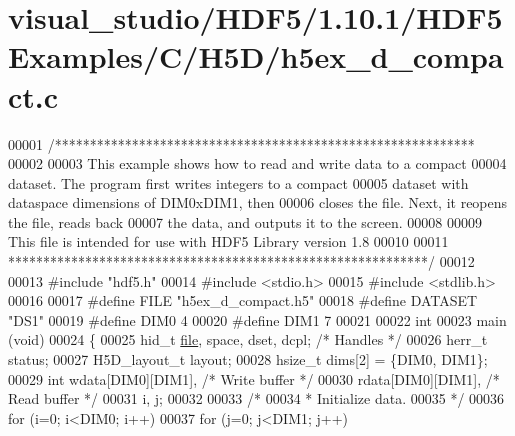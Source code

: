 \hypertarget{visual__studio_2_h_d_f5_21_810_81_2_h_d_f5_examples_2_c_2_h5_d_2h5ex__d__compact_8c_source}{}\section{visual\+\_\+studio/\+H\+D\+F5/1.10.1/\+H\+D\+F5\+Examples/\+C/\+H5\+D/h5ex\+\_\+d\+\_\+compact.c}
\label{visual__studio_2_h_d_f5_21_810_81_2_h_d_f5_examples_2_c_2_h5_d_2h5ex__d__compact_8c_source}

\begin{DoxyCode}
00001 \textcolor{comment}{/************************************************************}
00002 \textcolor{comment}{}
00003 \textcolor{comment}{  This example shows how to read and write data to a compact}
00004 \textcolor{comment}{  dataset.  The program first writes integers to a compact}
00005 \textcolor{comment}{  dataset with dataspace dimensions of DIM0xDIM1, then}
00006 \textcolor{comment}{  closes the file.  Next, it reopens the file, reads back}
00007 \textcolor{comment}{  the data, and outputs it to the screen.}
00008 \textcolor{comment}{}
00009 \textcolor{comment}{  This file is intended for use with HDF5 Library version 1.8}
00010 \textcolor{comment}{}
00011 \textcolor{comment}{ ************************************************************/}
00012 
00013 \textcolor{preprocessor}{#include "hdf5.h"}
00014 \textcolor{preprocessor}{#include <stdio.h>}
00015 \textcolor{preprocessor}{#include <stdlib.h>}
00016 
00017 \textcolor{preprocessor}{#define FILE            "h5ex\_d\_compact.h5"}
00018 \textcolor{preprocessor}{#define DATASET         "DS1"}
00019 \textcolor{preprocessor}{#define DIM0            4}
00020 \textcolor{preprocessor}{#define DIM1            7}
00021 
00022 \textcolor{keywordtype}{int}
00023 main (\textcolor{keywordtype}{void})
00024 \{
00025     hid\_t       \hyperlink{structfile}{file}, space, dset, dcpl;    \textcolor{comment}{/* Handles */}
00026     herr\_t      status;
00027     H5D\_layout\_t    layout;
00028     hsize\_t     dims[2] = \{DIM0, DIM1\};
00029     \textcolor{keywordtype}{int}         wdata[DIM0][DIM1],          \textcolor{comment}{/* Write buffer */}
00030                 rdata[DIM0][DIM1],          \textcolor{comment}{/* Read buffer */}
00031                 i, j;
00032 
00033     \textcolor{comment}{/*}
00034 \textcolor{comment}{     * Initialize data.}
00035 \textcolor{comment}{     */}
00036     \textcolor{keywordflow}{for} (i=0; i<DIM0; i++)
00037         \textcolor{keywordflow}{for} (j=0; j<DIM1; j++)

\end{DoxyCode}
